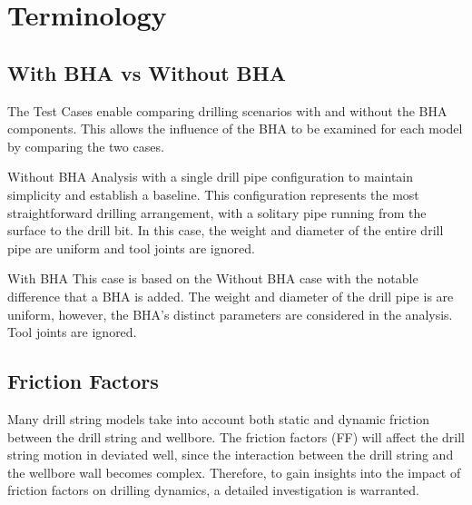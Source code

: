 \section{Terminology}
\subsection{With BHA vs Without BHA}
The Test Cases enable comparing drilling scenarios with and without the BHA components. This allows the influence of the BHA to be examined for each model by comparing the two cases.

\begin{definition}{Without BHA}
Analysis with a single drill pipe configuration to maintain simplicity and establish a baseline. This configuration represents the most straightforward drilling arrangement, with a solitary pipe running from the surface to the drill bit. In this case, the weight and diameter of the entire drill pipe are uniform and tool joints are ignored.
\end{definition}
\begin{definition}{With BHA}
This case is based on the Without BHA case with the notable difference that a BHA is added.  The weight and diameter of the drill pipe is are uniform, however, the BHA's distinct parameters are considered in the analysis.  Tool joints are ignored.
\end{definition}


\subsection{Friction Factors}
Many drill string models take into account both static and dynamic friction between the drill string and wellbore. The friction factors (FF) will affect the drill string motion in deviated well, since the interaction between the drill string and the wellbore wall becomes complex.\wording{}  Therefore, to gain insights into the impact of friction factors on drilling dynamics, a detailed investigation is warranted.\wording{}


